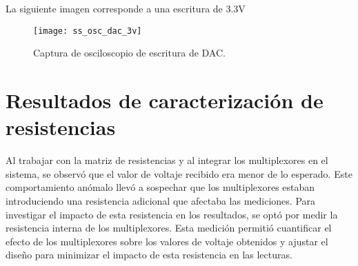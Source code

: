             
La siguiente imagen corresponde a una escritura de 3.3V           
            \begin{figure}[hbtp]
                \centering
                \texttt{[image: ss\_osc\_dac\_3v]}
                \caption{Captura de osciloscopio de escritura de DAC.}
                \label{fig:ss_osc_dac_3v}
            \end{figure}   
                                 
\section{Resultados de caracterización de resistencias}  
Al trabajar con la matriz de resistencias y al integrar los multiplexores en el sistema, se observó que el valor de voltaje recibido era menor de lo esperado. Este comportamiento anómalo llevó a sospechar que los multiplexores estaban introduciendo una resistencia adicional que afectaba las mediciones. Para investigar el impacto de esta resistencia en los resultados, se optó por medir la resistencia interna de los multiplexores. Esta medición permitió cuantificar el efecto de los multiplexores sobre los valores de voltaje obtenidos y ajustar el diseño para minimizar el impacto de esta resistencia en las lecturas.
            \begin{table}[htbp]
                \caption{Resistencia de multiplexores.}
                \begin{center}
                \label{tab:Mux_res}
                \end{center}
            \end{table}

